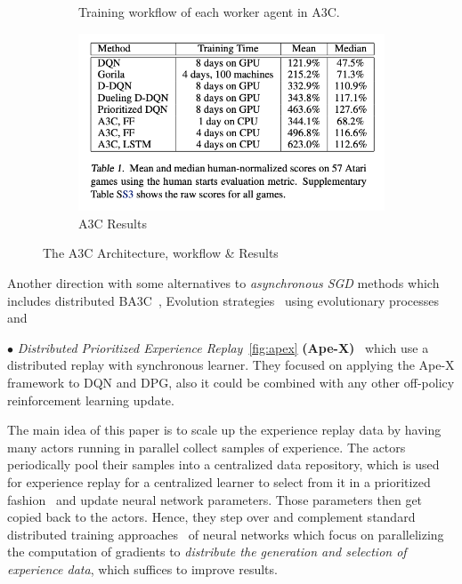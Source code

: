 \begin{figure}[!htb]
\begin{subfigure}[b]{0.3\textwidth}
				\caption{Training workflow of each worker agent in A3C.}
				\label{fig:a3c_workflow}
		\end{subfigure}
		\hfill
		\begin{subfigure}[b]{0.3\textwidth}
				\centering
				\includegraphics[width=\textwidth]{figures/algos/a3c_results.png}
				\caption{A3C Results}
				\label{fig:a3c_results}
		\end{subfigure}
		\hfill
		 \caption{The A3C Architecture, workflow \& Results}
		 \label{fig:a3c}
\end{figure}

Another direction with some alternatives to \textit{asynchronous SGD} methods which includes distributed BA3C~\parencite{adamski2018distributed}, Evolution strategies~\parencite{salimans2017evolution} using evolutionary processes and 

$\bullet$ \textit{Distributed Prioritized Experience Replay}~\ref{fig:apex} \textbf{(Ape-X)}~\parencite{horgan2018distributed} which use a distributed replay with synchronous learner. They focused on applying the Ape-X framework to DQN and DPG, also it could  be combined with any other off-policy reinforcement learning update. 

The main idea of this paper is to scale up the experience replay data by having many actors running in parallel  collect samples of experience. The actors periodically pool their samples into a centralized data repository, which is used for experience replay for a centralized learner to select from it in a prioritized fashion~\parencite{schaul2015prioritized} and update neural network parameters. Those parameters then get copied back to the actors. Hence, they step over and complement standard distributed training approaches~\parencite{dean2012large} of neural networks which focus on parallelizing the computation of gradients to \textit{distribute the generation and selection of experience data}, which suffices to improve results.

